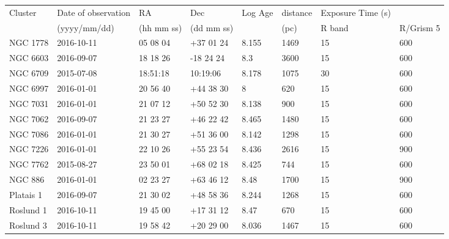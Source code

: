 \documentclass{jaa}
\begin{document}
\newpage 
\begin{table*}[]
\begin{tabular}{llllllll} \hline

Cluster & Date of observation & RA & Dec & Log Age & distance & Exposure Time (s) &      \\
       & (yyyy/mm/dd)           & (hh mm ss)      & (dd mm ss)       &     & (pc)        & R band      & R/Grism 5 \\ \hline
NGC 1778         & 2016-10-11          & 05 08 04      & +37 01 24      & 8.155      & 1469          & 15          & 600           \\
NGC 6603         & 2016-09-07          & 18 18 26      & -18 24 24      & 8.3       & 3600          & 15          & 600           \\
NGC 6709         & 2015-07-08          & 18:51:18      & 10:19:06       & 8.178      & 1075          & 30          & 600           \\
NGC 6997         & 2016-01-01          & 20 56 40      & +44 38 30      & 8        & 620           & 15          & 600           \\
NGC 7031         & 2016-01-01          & 21 07 12      & +50 52 30      & 8.138      & 900           & 15          & 600           \\
NGC 7062         & 2016-09-07          & 21 23 27      & +46 22 42      & 8.465      & 1480          & 15          & 600           \\
NGC 7086         & 2016-01-01          & 21 30 27      & +51 36 00      & 8.142      & 1298          & 15          & 600           \\
NGC 7226         & 2016-01-01          & 22 10 26      & +55 23 54      & 8.436      & 2616          & 15          & 900           \\
NGC 7762         & 2015-08-27          & 23 50 01      & +68 02 18      & 8.425      & 744           & 15          & 600           \\
NGC 886         & 2016-01-01          & 02 23 27      & +63 46 12      & 8.48       & 1700          & 15          & 900           \\
Platais 1        & 2016-09-07          & 21 30 02      & +48 58 36      & 8.244      & 1268          & 15          & 600           \\
Roslund 1        & 2016-10-11          & 19 45 00      & +17 31 12      & 8.47       & 670           & 15          & 600           \\
Roslund 3        & 2016-10-11          & 19 58 42      & +20 29 00      & 8.036      & 1467          & 15          & 600           \\

\end{tabular}
\end{table*}
\end{document}
